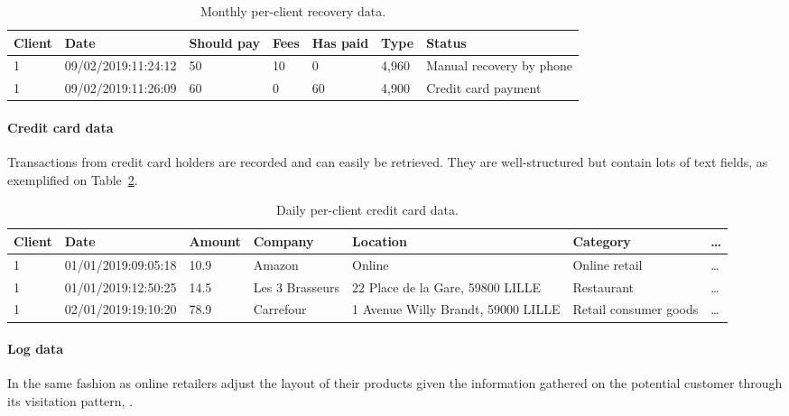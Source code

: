 \begin{table}[ht]
    \centering
    \caption{Monthly per-client recovery data.}
    \label{tab:recovery_data}
    \begin{small}
\begin{tabular}{lllllll}
Client & Date & Should pay & Fees & Has paid & Type & Status \\
 \hline
1 & 09/02/2019:11:24:12 & 50 & 10 & 0 & 4{,}960 & Manual recovery by phone \\
1 & 09/02/2019:11:26:09 & 60 & 0 & 60 & 4{,}900 & Credit card payment \\
\end{tabular}
    \end{small}
\end{table}

\paragraph{Credit card data}

Transactions from credit card holders are recorded and can easily be retrieved. They are well-structured but contain lots of text fields, as exemplified on Table~\ref{tab:credit_card_data}.

\begin{table}[ht]
    \centering
    \caption{Daily per-client credit card data.}
    \label{tab:credit_card_data}
    \begin{tiny}
\begin{tabular}{lllllll}
Client & Date & Amount & Company & Location & Category & \dots \\
 \hline
1 & 01/01/2019:09:05:18 & 10.9 & Amazon & Online & Online retail & \dots \\
1 & 01/01/2019:12:50:25 & 14.5 & Les 3 Brasseurs & 22 Place de la Gare, 59800 LILLE & Restaurant & \dots \\
1 & 02/01/2019:19:10:20 & 78.9 & Carrefour & 1 Avenue Willy Brandt, 59000 LILLE & Retail consumer goods & \dots 
\end{tabular}
    \end{tiny}
\end{table}


\paragraph{Log data}

In the same fashion as online retailers adjust the layout of their products given the information gathered on the potential customer through its visitation pattern, .

